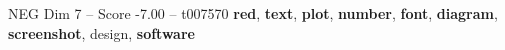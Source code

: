 \begin{textsample}{NEG Dim 7 – Score -7.00 – t007570}  \label{ex:f7_neg_033}
\textbf{red}, \textbf{text}, \textbf{plot}, \textbf{number}, \textbf{font}, \textbf{diagram}, \textbf{screenshot}, design, \textbf{software}

\end{textsample}
